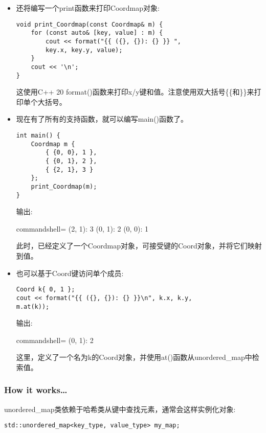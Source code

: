 \begin{itemize}
\item 
还将编写一个print函数来打印Coordmap对象:

\begin{lstlisting}[style=styleCXX]
void print_Coordmap(const Coordmap& m) {
	for (const auto& [key, value] : m) {
		cout << format("{{ ({}, {}): {} }} ",
		key.x, key.y, value);
	}
	cout << '\n';
}
\end{lstlisting}

这使用C++ 20 format()函数来打印x/y键和值。注意使用双大括号\{\{和\}\}来打印单个大括号。

\item 
现在有了所有的支持函数，就可以编写main()函数了。

\begin{lstlisting}[style=styleCXX]
int main() {
	Coordmap m {
		{ {0, 0}, 1 },
		{ {0, 1}, 2 },
		{ {2, 1}, 3 }
	};
	print_Coordmap(m);
}
\end{lstlisting}

输出:

\begin{tcblisting}{commandshell={}}
{ (2, 1): 3 } { (0, 1): 2 } { (0, 0): 1 }
\end{tcblisting}

此时，已经定义了一个Coordmap对象，可接受键的Coord对象，并将它们映射到值。

\item 
也可以基于Coord键访问单个成员:

\begin{lstlisting}[style=styleCXX]
Coord k{ 0, 1 };
cout << format("{{ ({}, {}): {} }}\n", k.x, k.y,
m.at(k));
\end{lstlisting}

输出:

\begin{tcblisting}{commandshell={}}
{ (0, 1): 2 }
\end{tcblisting}

这里，定义了一个名为k的Coord对象，并使用at()函数从unordered\_map中检索值。

\end{itemize}

\subsubsection{How it works…}

unordered\_map类依赖于哈希类从键中查找元素，通常会这样实例化对象:

\begin{lstlisting}[style=styleCXX]
std::unordered_map<key_type, value_type> my_map;
\end{lstlisting}

